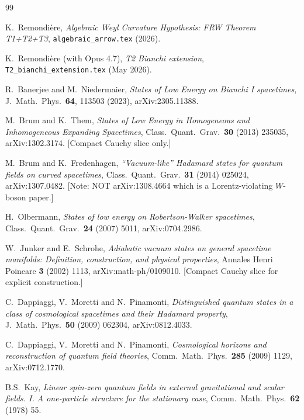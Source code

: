 \documentclass[11pt,a4paper]{article}
\theoremstyle{definition}
\begin{document}
\begin{thebibliography}{99}

K.\ Remondi\`ere, \emph{Algebraic Weyl Curvature Hypothesis: FRW Theorem
T1+T2+T3}, \texttt{algebraic\_arrow.tex} (2026).

K.\ Remondi\`ere (with Opus 4.7), \emph{T2 Bianchi extension},
\texttt{T2\_bianchi\_extension.tex} (May 2026).

R.\ Banerjee and M.\ Niedermaier, \emph{States of Low Energy on Bianchi I
spacetimes}, J.\ Math.\ Phys.\ \textbf{64}, 113503 (2023),
arXiv:2305.11388.

M.\ Brum and K.\ Them, \emph{States of Low Energy in Homogeneous and
Inhomogeneous Expanding Spacetimes}, Class.\ Quant.\ Grav.\ \textbf{30}
(2013) 235035, arXiv:1302.3174. [Compact Cauchy slice only.]

M.\ Brum and K.\ Fredenhagen, \emph{``Vacuum-like'' Hadamard states for
quantum fields on curved spacetimes}, Class.\ Quant.\ Grav.\ \textbf{31}
(2014) 025024, arXiv:1307.0482. [Note: NOT arXiv:1308.4664 which is a
Lorentz-violating $W$-boson paper.]

H.\ Olbermann, \emph{States of low energy on Robertson-Walker spacetimes},
Class.\ Quant.\ Grav.\ \textbf{24} (2007) 5011, arXiv:0704.2986.

W.\ Junker and E.\ Schrohe, \emph{Adiabatic vacuum states on general
spacetime manifolds: Definition, construction, and physical properties},
Annales Henri Poincare \textbf{3} (2002) 1113, arXiv:math-ph/0109010.
[Compact Cauchy slice for explicit construction.]

C.\ Dappiaggi, V.\ Moretti and N.\ Pinamonti, \emph{Distinguished quantum
states in a class of cosmological spacetimes and their Hadamard property},
J.\ Math.\ Phys.\ \textbf{50} (2009) 062304, arXiv:0812.4033.

C.\ Dappiaggi, V.\ Moretti and N.\ Pinamonti, \emph{Cosmological horizons
and reconstruction of quantum field theories}, Comm.\ Math.\ Phys.\
\textbf{285} (2009) 1129, arXiv:0712.1770.

B.S.\ Kay, \emph{Linear spin-zero quantum fields in external gravitational
and scalar fields. I. A one-particle structure for the stationary case},
Comm.\ Math.\ Phys.\ \textbf{62} (1978) 55.


\end{thebibliography}
\end{document}
